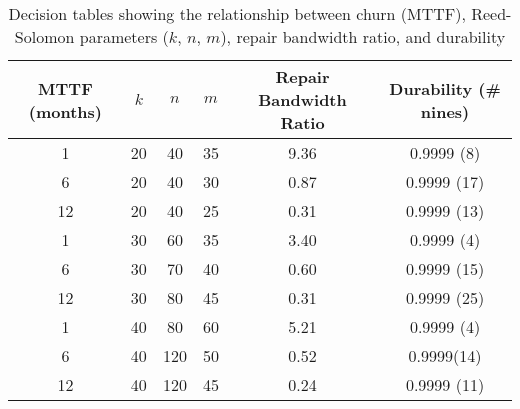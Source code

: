 \begin{table}[!htpb]\centering

\begin{tabular}{| c | c c c | c | c|}\hline
MTTF (months) &$k$& $n$ & $m$ &Repair Bandwidth Ratio&Durability (\# nines) \\\hline
1 &20& 40 & 35 & 9.36 & 0.9999 (8) \\
6 &20& 40 & 30 & 0.87 & 0.9999 (17) \\
12 &20& 40 & 25 & 0.31 & 0.9999 (13)\\\hline

1 &30& 60 & 35 & 3.40 &0.9999 (4)\\
6 &30& 70 & 40 & 0.60 &0.9999 (15)\\
12 &30& 80 & 45 & 0.31 &0.9999 (25) \\\hline

1 &40& 80 & 60 & 5.21 &0.9999 (4)\\
6 &40&120&50 & 0.52 &0.9999(14)\\
12 &40&120&45 & 0.24 &0.9999 (11)\\\hline

\end{tabular}
\caption{Decision tables showing the relationship between churn (MTTF),
  Reed-Solomon parameters ($k$, $n$, $m$), repair bandwidth ratio, and durability}
\label{rs:decision-tables}
\end{table}
